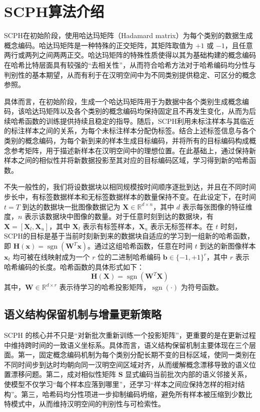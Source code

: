 \section{SCPH算法介绍}

SCPH在初始阶段，使用哈达玛矩阵（Hadamard matrix）为每个类别的数据生成概念编码。哈达玛矩阵是一种特殊的正交矩阵，其矩阵取值为 $+1$ 或 $-1$，且任意两行或两列之间两两正交。哈达玛矩阵的特殊性质使得以其为基础构建的概念编码在哈希比特层面具有较强的“去相关性”，从而符合哈希方法对于哈希编码均分性与判别性的基本期望，从而有利于在汉明空间中为不同类别提供稳定、可区分的概念参照。

具体而言，在初始阶段，生成一个哈达玛矩阵用于为数据中各个类别生成概念编码，该哈达玛矩阵以及各个类别的概念编码均保持固定且不再发生变化，从而为后续哈希函数的训练提供持续且稳定的指导。随后，SCPH利用未标注样本与其临近的标注样本之间的关系，为每个未标注样本分配伪标签。结合上述标签信息与各个类别的概念编码，为每个新到来的样本生成目标编码，并将所有的目标编码构成概念参考矩阵，用于描述新样本在汉明空间中的理想位置。在此基础上，通过保持新样本之间的相似性并将新数据投影至其对应的目标编码区域，学习得到新的哈希函数。

不失一般性的，我们将设数据块以相同规模按时间顺序逐批到达，并且在不同时间步长中，有标签数据样本和无标签数据样本的数量保持不变。在此设定下，在时间 $t = T$ 到达的数据块一批图像数据记为 $\mathbf{X} \in \mathbb{R}^{d \times n}$，其中 $d$ 表示每张图像的特征维度，$n$ 表示该数据块中图像的数量。对于任意时刻到达的数据块，有 $\mathbf{X} = [\mathbf{X}_l, \mathbf{X}_u]$，其中 $\mathbf{X}_l$ 表示有标签样本，$\mathbf{X}_u$ 表示无标签样本。在 $t$ 时刻，SCPH的目标是基于当前时刻新到来的数据块自适应的学习到一组新的哈希函数，即 $\mathbf{H}(\mathbf{x}) = \operatorname{sgn}(\mathbf{W}^T \mathbf{x})$。通过这组哈希函数，任意在时间 $t$ 到达的新图像样本 $\mathbf{x}_t$ 均可被在线映射成为一个 $r$ 位的二进制哈希编码 $\mathbf{b} \in \{-1, +1\}^r$，其中 $r$ 表示哈希编码的长度。哈希函数的具体形式如下：
\begin{equation}
  \mathbf{H}(\mathbf{X}) = \operatorname{sgn}(\mathbf{W}^T \mathbf{X})
\end{equation}
其中，$\mathbf{W} \in \mathbb{R}^{d \times r}$ 表示待学习的哈希投影矩阵，$\operatorname{sgn}(\cdot)$ 为符号函数。

\subsection{语义结构保留机制与增量更新策略}

SCPH 的核心并不只是“对新批次重新训练一个投影矩阵”，更重要的是在更新过程中维持跨时间的一致语义坐标系。具体而言，语义结构保留机制主要体现在三个层面。第一，固定概念编码机制为每个类别分配长期不变的目标区域，使同一类别在不同时间步到达时均朝向同一汉明空间区域对齐，从而缓解概念漂移导致的语义位置漂移问题。第二，成对相似性矩阵 $\mathbf{S}$ 显式编码当前批次内部的语义邻接关系，使模型不仅学习“每个样本应落到哪里”，还学习“样本之间应保持怎样的相对结构”。第三，哈希码均分性项进一步抑制编码坍缩，避免所有样本被压缩到少数比特模式中，从而维持汉明空间的判别性与可检索性。

